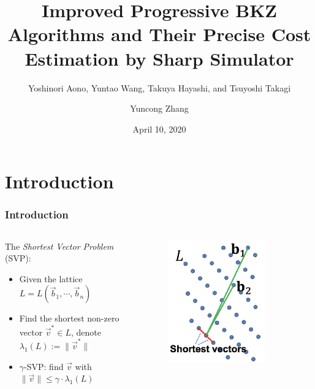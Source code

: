 \documentclass{beamer}
\title{Improved Progressive BKZ Algorithms and Their Precise Cost Estimation by Sharp Simulator}
\subtitle{Yoshinori Aono, Yuntao Wang, Takuya Hayashi, and Tsuyoshi Takagi}
\author{Yuncong Zhang}
\date{April 10, 2020}
\newcommand{\vb}{\vec{b}}
\newcommand{\vv}{\vec{v}}
\newcommand{\vvs}{\vec{v}^*}
\begin{document}
\frame{\titlepage}


\section{Introduction}
\frame
{
  \frametitle{Introduction}
  \begin{columns}
  \begin{column}{0.6\textwidth}
  The \emph{Shortest Vector Problem} (SVP):
  \begin{itemize}
  	\item Given the lattice $L=L(\vb_1,\cdots,\vb_n)$
  	\item Find the shortest non-zero vector $\vvs\in L$, denote $\lambda_1(L):=\|\vvs\|$
  	\item $\gamma$-SVP: find $\vv$ with $\|\vv\|\leq\gamma\cdot\lambda_1(L)$
  \end{itemize}
  \end{column}
  \begin{column}{0.4\textwidth}
  \begin{figure}[tb]
  	\centering
  	\includegraphics[width=0.8\textwidth]{files/BKZ-SVP.png}
  	\label{fig:svp}
  \end{figure}
  \end{column}
  \end{columns}
}
\end{document}
